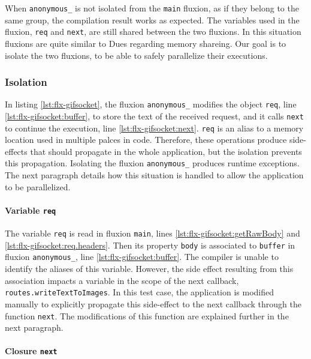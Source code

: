 When \texttt{anony\-mous\_} is not isolated from the \texttt{main} fluxion, as if they belong to the same group, the compilation result works as expected.
The variables used in the fluxion, \texttt{req} and \texttt{next}, are still shared between the two fluxions.
In this situation fluxions are quite similar to Dues regarding memory shareing.
Our goal is to isolate the two fluxions, to be able to safely parallelize their executions.

\subsubsection{Isolation} \label{chapter5:flx:evaluation:isolation}

In listing \ref{lst:flx-gifsocket}, the fluxion \texttt{anony\-mous\_} modifies the object \texttt{req}, line \ref{lst:flx-gifsocket:buffer}, to store the text of the received request, and it calls \texttt{next} to continue the execution, line \ref{lst:flx-gifsocket:next}.
\texttt{req} is an alias to a memory location used in multiple palces in code.
Therefore, these operations produce side-effects that should propagate in the whole application, but the isolation prevents this propagation.
Isolating the fluxion \texttt{anony\-mous\_} produces runtime exceptions.
The next paragraph details how this situation is handled to allow the application to be parallelized.

\paragraph{Variable \texttt{req}}

The variable \texttt{req} is read in fluxion \texttt{main}, lines \ref{lst:flx-gifsocket:getRawBody} and \ref{lst:flx-gifsocket:req.headers}.
Then its property \texttt{body} is associated to \texttt{buffer} in fluxion \texttt{anony\-mous\_}, line \ref{lst:flx-gifsocket:buffer}.
The compiler is unable to identify the aliases of this variable. %
However, the side effect resulting from this association impacts a variable in the scope of the next callback, \texttt{routes.write\-Text\-To\-Images}.
In this test case, the application is modified manually to explicitly propagate this side-effect to the next callback through the function \texttt{next}.
The modifications of this function are explained further in the next paragraph.

\paragraph{Closure \texttt{next}}

